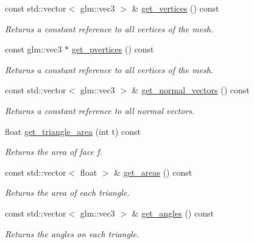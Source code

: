 \begin{DoxyCompactItemize}
const std\+::vector$<$ glm\+::vec3 $>$ \& \hyperlink{classgeoproc_1_1TriangleMesh_a5dcfcb21cbd8e737813ff17cf5ecc566}{get\+\_\+vertices} () const
\begin{DoxyCompactList}\small\item\em Returns a constant reference to all vertices of the mesh. \end{DoxyCompactList}\item 
\mbox{\label{classgeoproc_1_1TriangleMesh_a5298c715723c9f247a998418d3fea286}} 
const glm\+::vec3 $\ast$ \hyperlink{classgeoproc_1_1TriangleMesh_a5298c715723c9f247a998418d3fea286}{get\+\_\+pvertices} () const
\begin{DoxyCompactList}\small\item\em Returns a constant reference to all vertices of the mesh. \end{DoxyCompactList}\item 
const std\+::vector$<$ glm\+::vec3 $>$ \& \hyperlink{classgeoproc_1_1TriangleMesh_ac21af48c99662a753251a5b7507c175f}{get\+\_\+normal\+\_\+vectors} () const
\begin{DoxyCompactList}\small\item\em Returns a constant reference to all normal vectors. \end{DoxyCompactList}\item 
float \hyperlink{classgeoproc_1_1TriangleMesh_ad43ef04d90bdde58951b3ee438b87c1e}{get\+\_\+triangle\+\_\+area} (int t) const
\begin{DoxyCompactList}\small\item\em Returns the area of face {\itshape f}. \end{DoxyCompactList}\item 
\mbox{\label{classgeoproc_1_1TriangleMesh_a17b467002bd0f8373f7de367adfb1ec2}} 
const std\+::vector$<$ float $>$ \& \hyperlink{classgeoproc_1_1TriangleMesh_a17b467002bd0f8373f7de367adfb1ec2}{get\+\_\+areas} () const
\begin{DoxyCompactList}\small\item\em Returns the area of each triangle. \end{DoxyCompactList}\item 
const std\+::vector$<$ glm\+::vec3 $>$ \& \hyperlink{classgeoproc_1_1TriangleMesh_ae883c39c841c6598b0490224755f25b9}{get\+\_\+angles} () const
\begin{DoxyCompactList}\small\item\em Returns the angles on each triangle. \end{DoxyCompactList}\item 

\end{DoxyCompactItemize}

